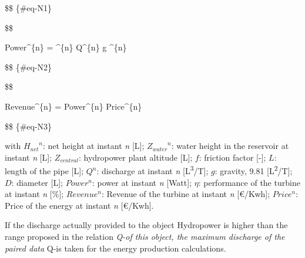 \documentclass[
  letterpaper,
  DIV=11,
  numbers=noendperiod]{scrreprt}
\begin{document}
\$\$ \{\#eq-N1\}

\$\$

Power\^{}\{n\} = \eta\^{}\{n\}  \cdot Q\^{}\{n\} \cdot g
\^{}\{n\}

\$\$ \{\#eq-N2\}

\$\$

Revenue\^{}\{n\} = Power\^{}\{n\} \cdot Price\^{}\{n\}

\$\$ \{\#eq-N3\}

with \({H_{net}}^n\): net height at instant \emph{n} {[}L{]};
\({Z_{water}}^n\): water height in the reservoir at instant \emph{n}
{[}L{]}; \(Z_{central}\): hydropower plant altitude {[}L{]}; \(f\):
friction factor {[}-{]}; \(L\): length of the pipe {[}L{]}; \(Q^n\):
discharge at instant \emph{n} {[}L\textsuperscript{3}/T{]}; \(g\):
gravity, 9.81 {[}L\textsuperscript{2}/T{]}; \(D\): diameter {[}L{]};
\(Power^n\): power at instant \emph{n} {[}Watt{]}; \(\eta\): performance
of the turbine at instant \emph{n} {[}\%{]}; \(Revenue^n\): Revenue of
the turbine at instant \emph{n} {[}\euro{}/Kwh{]}; \(Price^n\): Price of
the energy at instant \emph{n} {[}\euro{}/Kwh{]}.

If the discharge actually provided to the object Hydropower is higher
than the range proposed in the relation \emph{Q-\eta* of this object,
the maximum discharge of the paired data }Q-\eta* is taken for the
energy production calculations.
\end{document}
